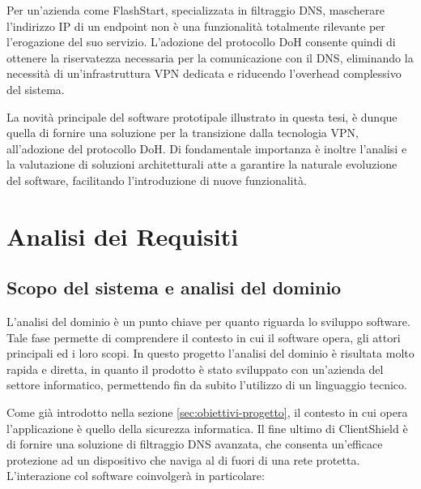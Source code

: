 \documentclass[12pt,a4paper,openright,twoside]{book}
\begin{document}
Per un'azienda come FlashStart, specializzata in filtraggio \gls{DNS}, mascherare l'indirizzo IP di un endpoint non è una funzionalità totalmente rilevante per l'erogazione del suo servizio.
L'adozione del protocollo \gls{DoH} consente quindi di ottenere la riservatezza necessaria per la comunicazione con il \gls{DNS}, eliminando la necessità di un'infrastruttura \gls{VPN} dedicata e riducendo l'overhead complessivo del sistema.

La novità principale del software prototipale illustrato in questa tesi, è dunque quella di fornire una soluzione per la transizione dalla tecnologia \gls{VPN}, all'adozione del protocollo \gls{DoH}.
Di fondamentale importanza è inoltre l'analisi e la valutazione di soluzioni architetturali atte a garantire la naturale evoluzione del software, facilitando l'introduzione di nuove funzionalità.



\chapter{Analisi dei Requisiti}
\label{chap:analisi-dei-requisiti}

\section{Scopo del sistema e analisi del dominio}

L'analisi del dominio è un punto chiave per quanto riguarda lo sviluppo software.
Tale fase permette di comprendere il contesto in cui il software opera, gli attori principali ed i loro scopi.
In questo progetto l'analisi del dominio è risultata molto rapida e diretta, in quanto il prodotto è stato sviluppato con un'azienda del settore informatico, permettendo fin da subito l'utilizzo di un linguaggio tecnico.

Come già introdotto nella sezione \ref{sec:obiettivi-progetto}, il contesto in cui opera l'applicazione è quello della sicurezza informatica.
Il fine ultimo di ClientShield è di fornire una soluzione di filtraggio \gls{DNS} avanzata, che consenta un'efficace protezione ad un dispositivo che naviga al di fuori di una rete protetta.
L'interazione col software coinvolgerà in particolare:
\end{document}
